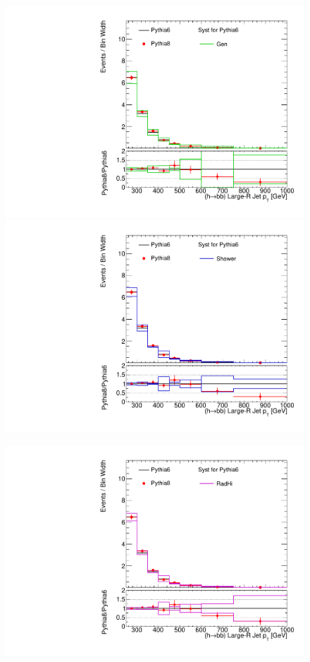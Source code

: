 \begin{figure}[!h]
\begin{center}
\includegraphics[scale=0.33]{./figures/boosted/TTBarPy6VsPy8/TTBarPy6VsPy8_SR_HbbPt_gen} 
\includegraphics[scale=0.33]{./figures/boosted/TTBarPy6VsPy8/TTBarPy6VsPy8_SR_HbbPt_shower} \\
\par\medskip
\includegraphics[scale=0.33]{./figures/boosted/TTBarPy6VsPy8/TTBarPy6VsPy8_SR_HbbPt_radhi} 

\end{center}
\end{figure}
